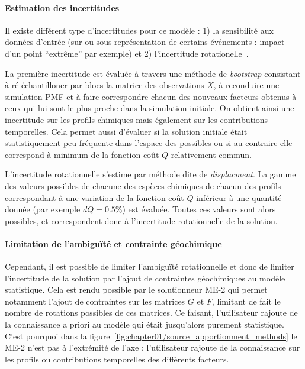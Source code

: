 \paragraph{Estimation des incertitudes}%
\label{par:incertitudes}

Il existe différent type d'incertitudes pour ce modèle : 1) la sensibilité aux données
d'entrée (sur ou sous représentation de certains événements : impact d'un point
``extrême'' par exemple) et 2) l'incertitude rotationelle~\autocite{brownMethods2015}.

La première incertitude est évaluée à travers une méthode de \textit{bootstrap} consistant
à ré-échantilloner par blocs la matrice des observations $X$, à reconduire une simulation
PMF et à faire correspondre chacun des nouveaux facteurs obtenus à ceux qui lui sont le
plus proche dans la simulation initiale.
On obtient ainsi une incertitude sur les profils chimiques mais également sur les
contributions temporelles.
Cela permet aussi d'évaluer si la solution initiale était statistiquement peu fréquente
dans l'espace des possibles ou si au contraire elle correspond à minimum de la fonction
coût $Q$ relativement commun.

L'incertitude rotationnelle s'estime par méthode dite de \textit{displacment}. La gamme des
valeurs possibles de chacune des espèces chimiques de chacun des profils correspondant à
une variation de la fonction coût $Q$ inférieur à une quantité donnée (par exemple $dQ =
0.5\%$) est évaluée. Toutes ces valeurs sont alors possibles, et correspondent donc à
l'incertitude rotationnelle de la solution.

\paragraph{Limitation de l'ambiguïté et contrainte géochimique}%
\label{par:limitation_de_l_ambiguité_et_contrainte_géochimique}

Cependant, il est possible de limiter l'ambiguïté rotationnelle et donc de limiter
l'incertitude de la solution par l'ajout de contraintes géochimiques au modèle statistique.
Cela est rendu possible par le solutionneur ME-2 qui permet notamment l'ajout de contraintes
sur les matrices $G$ et $F$, limitant de fait le nombre de rotations possibles de ces
matrices. Ce faisant, l'utilisateur rajoute de la connaissance a priori au modèle qui
était jusqu'alors purement statistique. C'est pourquoi dans la
figure~\ref{fig:chapter01/source_apportionment_methods} le ME-2 n'est pas à l'extrémité de
l'axe : l'utilisateur rajoute de la connaissance sur les profils ou contributions
temporelles des différents facteurs.

